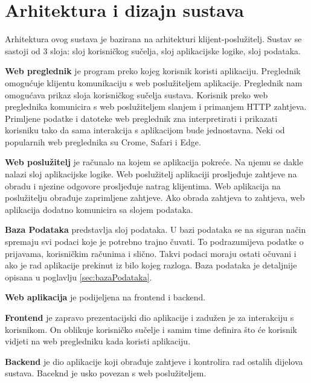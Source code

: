 \chapter{Arhitektura i dizajn sustava}
		
		Arhitektura ovog sustava je bazirana na arhitekturi klijent-poslužitelj. Sustav se sastoji od 3 sloja: sloj korisničkog sučelja, sloj aplikacijske logike, sloj podataka.
		
		\textbf{Web preglednik} je program preko kojeg korisnik koristi aplikaciju. Preglednik omogućuje klijentu komunikaciju s web poslužiteljem aplikacije. Preglednik nam omogućava prikaz sloja korisničkog sučelja sustava. Korisnik preko web preglednika komunicira s web poslužiteljem slanjem i primanjem HTTP zahtjeva. Primljene podatke i datoteke web preglednik zna interpretirati i prikazati korisniku tako da sama interakcija s aplikacijom bude jednostavna. Neki od popularnih web preglednika su Crome, Safari i Edge.
		
		\textbf{Web poslužitelj} je računalo na kojem se aplikacija pokreće. Na njemu se dakle nalazi sloj aplikacijske logike. Web poslužitelj aplikaciji prosljeđuje zahtjeve na obradu i njezine odgovore prosljeđuje natrag klijentima. Web aplikacija na poslužitelju obrađuje zaprimljene zahtjeve. Ako obrada zahtjeva to zahtjeva, web aplikacija dodatno komunicira sa slojem podataka.
		
		\textbf{Baza Podataka} predstavlja sloj podataka. U bazi podataka se na siguran način spremaju svi podaci koje je potrebno trajno čuvati. To podrazumijeva podatke o prijavama, korisničkim računima i slično. Takvi podaci moraju ostati očuvani i ako je rad aplikacije prekinut iz bilo kojeg razloga. Baza podataka je detaljnije opisana u poglavlju  \ref{sec:bazaPodataka}.
		
		\textbf{Web aplikacija} je podijeljena na frontend i backend.
		
		\textbf{Frontend} je zapravo prezentacijski dio aplikacije i zadužen je za interakciju s korisnikom. On oblikuje korisničko sučelje i samim time definira što će korisnik vidjeti na web pregledniku kada koristi aplikaciju.
		
		\textbf{Backend} je dio aplikacije koji obrađuje zahtjeve i kontrolira rad ostalih dijelova sustava. Baceknd je usko povezan s web poslužiteljem.
		
